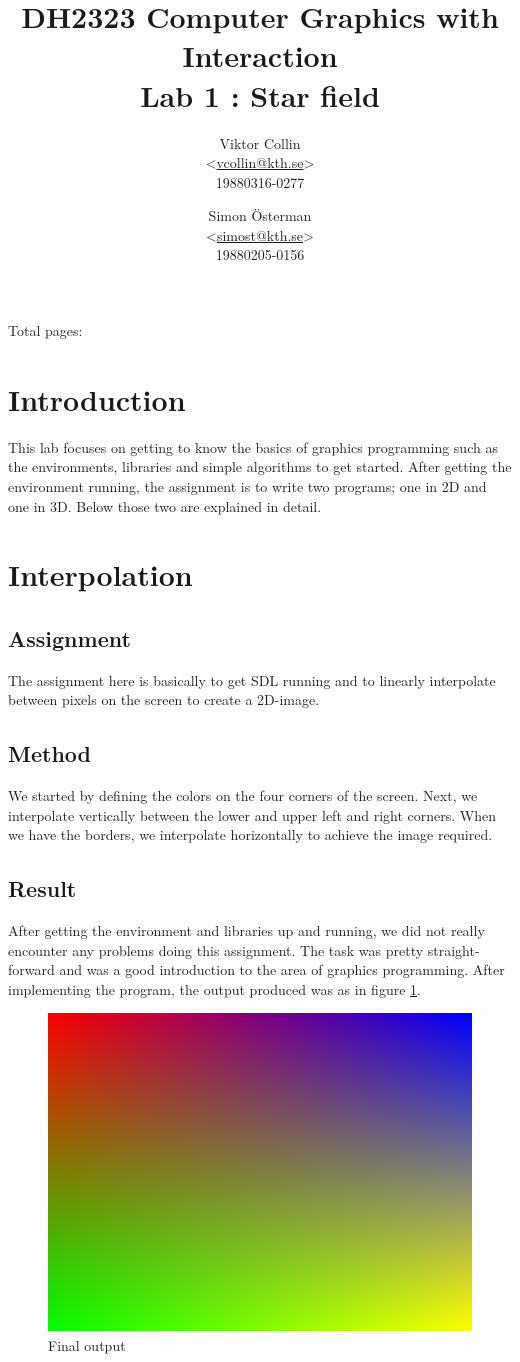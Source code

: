 \documentclass[a4paper,11pt]{article}
\author{Viktor Collin \\ <\url{vcollin@kth.se}> \\ 19880316-0277 \and Simon \"{O}sterman \\ <\url{simost@kth.se}> \\ 19880205-0156}
\title{\textbf{DH2323 Computer Graphics with Interaction \\ Lab 1 : Star field}}
\begin{document}
\maketitle
\begin{center}
Total pages: \pageref{LastPage}
\end{center}
\thispagestyle{empty}

\clearpage
\setcounter{page}{1}
\section*{Introduction}
This lab focuses on getting to know the basics of graphics programming such as the 
environments, libraries and simple algorithms to get started. After getting the environment running, the assignment is to write two programs; one in 2D and one in 3D. Below those two are explained in detail. 

\section{Interpolation}
\subsection{Assignment}
The assignment here is basically to get SDL running and to linearly interpolate between pixels on the screen to create a 2D-image.

\subsection{Method}
We started by defining the colors on the four corners of the screen. Next, we interpolate vertically between the lower and upper left and right corners. When we have the borders, we interpolate horizontally to achieve the image required. 

\subsection{Result}
After getting the environment and libraries up and running, we did not really encounter any problems doing this assignment. The task was pretty straight-forward and was a good introduction to the area of graphics programming. After implementing the program, the output produced was as in figure \ref{fig1}.
\begin{figure}[h!]
	\centering
	\includegraphics[width=0.75\linewidth]{screenshot1.png}
	\caption{Final output}
	\label{fig1}
\end{figure}
\end{document}
